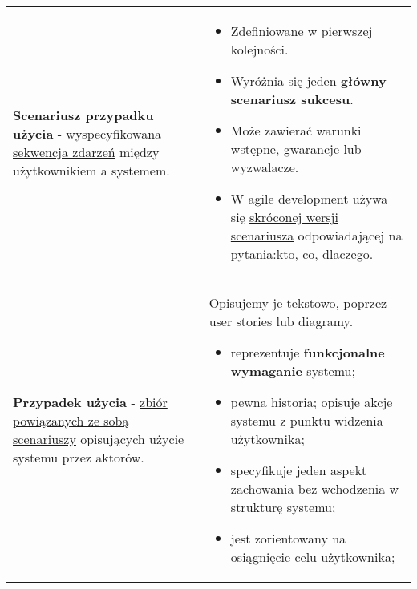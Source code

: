 \documentclass[../main.tex]{subfiles}
\begin{document}
    \begin{table}[H]
        \begin{center}
            \begin{tabular}{  p{6cm} p{10cm}  }

                \textbf{Scenariusz przypadku użycia} - wyspecyfikowana \underline{sekwencja zdarzeń} między użytkownikiem a systemem.
                &
                \begin{itemize}
                    \item Zdefiniowane w pierwszej kolejności.
                    \item Wyróżnia się jeden \textbf{główny scenariusz sukcesu}.
                    \item Może zawierać warunki wstępne, gwarancje lub wyzwalacze.
                    \item W agile development używa się \underline{skróconej wersji scenariusza} odpowiadającej
                    na pytania:kto, co, dlaczego.
                \end{itemize}
                \\

                \cmidrule(r){1-1}\cmidrule(l){2-2}

                \textbf{Przypadek użycia} - \underline{zbiór powiązanych ze sobą scenariuszy} opisujących użycie systemu przez aktorów.
                &
                Opisujemy je tekstowo, poprzez user stories lub diagramy.
                \begin{itemize}
                    \item reprezentuje \textbf{funkcjonalne wymaganie} systemu;
                    \item pewna historia; opisuje akcje systemu z punktu widzenia użytkownika;
                    \item specyfikuje jeden aspekt zachowania bez wchodzenia w strukturę systemu;
                    \item jest zorientowany na osiągnięcie celu użytkownika;
                \end{itemize}
                \\

            \end{tabular}
        \end{center}
    \end{table}
\end{document}

